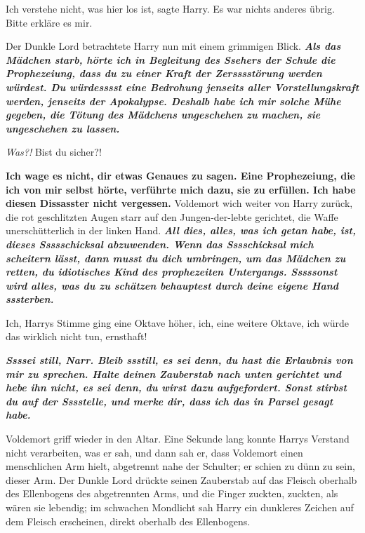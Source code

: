 \glqq{}Ich verstehe nicht, was hier los ist\grqq{}, sagte Harry. Es war nichts
anderes übrig. \glqq{}Bitte erkläre es mir.\grqq{}

Der Dunkle Lord betrachtete Harry nun mit einem grimmigen Blick. \glqq{}
\textbf{\emph{Als das Mädchen starb, hörte ich in Begleitung des Ssehers der
Schule die Prophezeiung, dass du zu einer Kraft der Zersssstörung werden
würdest. Du würdesssst eine Bedrohung jenseits aller Vorstellungskraft werden,
jenseits der Apokalypse. Deshalb habe ich mir solche Mühe gegeben, die Tötung
des Mädchens ungeschehen zu machen, sie ungeschehen zu lassen.}}\grqq{}

\emph{Was?!}
\glqq{}Bist du sicher?!\grqq{}

\glqq{}\textbf{Ich wage es nicht, dir etwas Genaues zu sagen. Eine Prophezeiung,
die ich von mir selbst hörte, verführte mich dazu, sie zu erfüllen. Ich habe
diesen Dissasster nicht vergessen.}\grqq{} Voldemort wich weiter von Harry zurück, die
rot geschlitzten Augen starr auf den Jungen-der-lebte gerichtet, die Waffe
unerschütterlich in der linken Hand. \glqq{}\textbf{\emph{All dies, alles, was
ich getan habe, ist, dieses Ssssschicksal abzuwenden. Wenn das Sssschicksal mich
scheitern lässt, dann musst du dich umbringen, um das Mädchen zu retten, du
idiotisches Kind des prophezeiten Untergangs. Sssssonst wird alles, was du zu
schätzen behauptest durch deine eigene Hand sssterben.}}\grqq{}

\glqq{}Ich\grqq{}, Harrys Stimme ging eine Oktave höher, \glqq{}ich\grqq{}, eine
weitere Oktave, \glqq{}ich würde das wirklich nicht tun, ernsthaft!\grqq{}

\glqq{}\textbf{\emph{Ssssei still, Narr. Bleib ssstill, es sei denn, du hast die
Erlaubnis von mir zu sprechen. Halte deinen Zauberstab nach unten gerichtet und
hebe ihn nicht, es sei denn, du wirst dazu aufgefordert. Sonst stirbst du auf
der Sssstelle, und merke dir, dass ich das in Parsel gesagt habe.}}\grqq{}

Voldemort griff wieder in den Altar. Eine Sekunde lang konnte Harrys Verstand
nicht verarbeiten, was er sah, und dann sah er, dass Voldemort einen
menschlichen Arm hielt, abgetrennt nahe der Schulter; er schien zu dünn zu sein,
dieser Arm. Der Dunkle Lord drückte seinen Zauberstab auf das Fleisch oberhalb
des Ellenbogens des abgetrennten Arms, und die Finger zuckten, zuckten, als
wären sie lebendig; im schwachen Mondlicht sah Harry ein dunkleres Zeichen auf
dem Fleisch erscheinen, direkt oberhalb des Ellenbogens.

